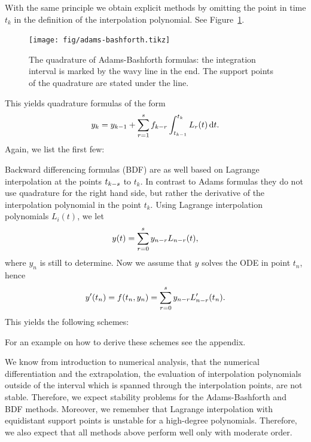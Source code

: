 \begin{example}
  \label{ex:lmm:1}
   With the same principle we obtain
  explicit methods by omitting the point in time $t_k$ in the
  definition of the interpolation polynomial. See
  Figure~\ref{fig:lmm:adams-bashforth}.
  \begin{figure}[tbp]
    \begin{center}
      \texttt{[image: fig/adams-bashforth.tikz]}
    \end{center}
    \caption{The quadrature of Adams-Bashforth formulas: the
      integration interval is marked by the wavy line in the end. The support 
			points of the quadrature are stated under the line.}
    \label{fig:lmm:adams-bashforth}
  \end{figure}
  This yields quadrature formulas of the form
  \begin{gather}
    \label{eq:lmm:17}
    y_k = y_{k-1} + \sum_{r=1}^s f_{k-r} \int_{t_{k-1}}^{t_k}
    L_r(t) \,\mathrm{d} t.
  \end{gather}
  Again, we list the first few:
  
\end{example}

\begin{example}
  \label{ex:lmm:3}
   Backward differencing formulas (BDF) are as well
  based on Lagrange interpolation at the points $t_{k-s}$ to
  $t_k$. In contrast to Adams formulas they do not use quadrature for
  the right hand side, but rather the derivative of the interpolation
  polynomial in the point $t_k$.  Using Lagrange interpolation
  polynomials $L_i(t)$, we let
  \begin{gather*}
    y(t) = \sum_{r=0}^s y_{n-r} L_{n-r}(t),
  \end{gather*}
  where $y_n$ is still to determine. Now we assume that $y$ solves the ODE
  in point $t_n$, hence
  \begin{gather*}
    y'(t_n) = f(t_n, y_n) = \sum_{r=0}^s y_{n-r} L'_{n-r}(t_n).
  \end{gather*}
  This yields the following schemes:
  
  For an example on how to derive these schemes see the appendix.
\end{example}

\begin{remark}
  We know from introduction to numerical analysis, that the numerical
  differentiation and the extrapolation, the evaluation of
  interpolation polynomials outside of the interval which is spanned
  through the interpolation points, are not stable.  Therefore, we
  expect stability problems for the Adams-Bashforth and BDF
  methods. Moreover, we remember that Lagrange interpolation with
  equidistant support points is unstable for a high-degree
  polynomials. Therefore, we also expect that all methods above
  perform well only with moderate order.
\end{remark}

